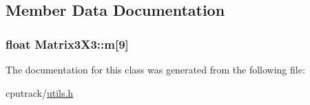 \subsection{Member Data Documentation}
\subsubsection[{\texorpdfstring{m}{m}}]{\setlength{\rightskip}{0pt plus 5cm}float Matrix3\+X3\+::m\mbox{[}9\mbox{]}}\hypertarget{class_matrix3_x3_a7c54fb7a859ee84f13efb2eccd28e5f5}{}\label{class_matrix3_x3_a7c54fb7a859ee84f13efb2eccd28e5f5}


The documentation for this class was generated from the following file\+:\begin{DoxyCompactItemize}
\item 
cputrack/\hyperlink{utils_8h}{utils.\+h}\end{DoxyCompactItemize}
